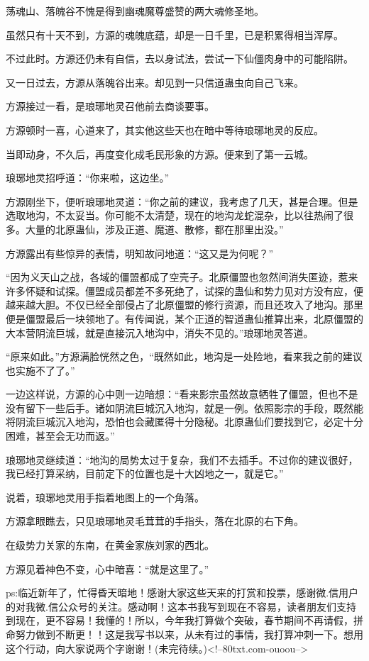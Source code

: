 \begin{this_body}
荡魂山、落魄谷不愧是得到幽魂魔尊盛赞的两大魂修圣地。

虽然只有十天不到，方源的魂魄底蕴，却是一日千里，已是积累得相当浑厚。

不过此时。方源还仍未有自信，去以身试法，尝试一下仙僵肉身中的可能陷阱。

又一日过去，方源从落魄谷出来。却见到一只信道蛊虫向自己飞来。

方源接过一看，是琅琊地灵召他前去商谈要事。

方源顿时一喜，心道来了，其实他这些天也在暗中等待琅琊地灵的反应。

当即动身，不久后，再度变化成毛民形象的方源。便来到了第一云城。

琅琊地灵招呼道：“你来啦，这边坐。”

方源刚坐下，便听琅琊地灵道：“你之前的建议，我考虑了几天，甚是合理。但是选取地沟，不太妥当。你可能不太清楚，现在的地沟龙蛇混杂，比以往热闹了很多。大量的北原蛊仙，涉及正道、魔道、散修，都在那里出没。”

方源露出有些惊异的表情，明知故问地道：“这又是为何呢？”

“因为义天山之战，各域的僵盟都成了空壳子。北原僵盟也忽然间消失匿迹，惹来许多怀疑和试探。僵盟成员都差不多死绝了，试探的蛊仙和势力见对方没有应，便越来越大胆。不仅已经全部侵占了北原僵盟的修行资源，而且还攻入了地沟。那里便是僵盟最后一块领地了。有传闻说，某个正道的智道蛊仙推算出来，北原僵盟的大本营阴流巨城，就是直接沉入地沟中，消失不见的。”琅琊地灵答道。

“原来如此。”方源满脸恍然之色，“既然如此，地沟是一处险地，看来我之前的建议也实施不了了。”

一边这样说，方源的心中则一边暗想：“看来影宗虽然故意牺牲了僵盟，但也不是没有留下一些后手。诸如阴流巨城沉入地沟，就是一例。依照影宗的手段，既然能将阴流巨城沉入地沟，恐怕也会藏匿得十分隐秘。北原蛊仙们要找到它，必定十分困难，甚至会无功而返。”

琅琊地灵继续道：“地沟的局势太过于复杂，我们不去插手。不过你的建议很好，我已经打算采纳，目前定下的位置也是十大凶地之一，就是它。”

说着，琅琊地灵用手指着地图上的一个角落。

方源拿眼瞧去，只见琅琊地灵毛茸茸的手指头，落在北原的右下角。

在级势力关家的东南，在黄金家族刘家的西北。

方源见着神色不变，心中暗喜：“就是这里了。”

ps:临近新年了，忙得昏天暗地！感谢大家这些天来的打赏和投票，感谢微.信用户的对我微.信公众号的关注。感动啊！这本书我写到现在不容易，读者朋友们支持到现在，更不容易！我懂的！所以，今年我打算做个突破，春节期间不再请假，拼命努力做到不断更！！这是我写书以来，从未有过的事情，我打算冲刺一下。想用这个行动，向大家说两个字谢谢！(未完待续。)<!--80txt.com-ouoou-->

\end{this_body}

